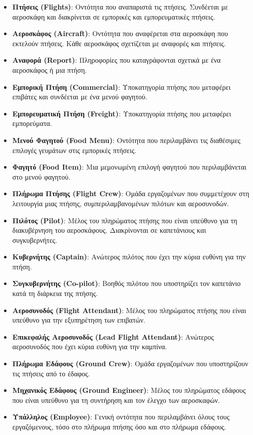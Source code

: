 \documentclass{article}
\begin{document}
\begin{itemize}
    \item \textbf{Πτήσεις (Flights)}: Οντότητα που αναπαριστά τις πτήσεις. Συνδέεται με αεροσκάφη και διακρίνεται σε εμπορικές και εμπορευματικές πτήσεις.
    \item \textbf{Αεροσκάφος (Aircraft)}: Οντότητα που αναφέρεται στα αεροσκάφη που εκτελούν πτήσεις. Κάθε αεροσκάφος σχετίζεται με αναφορές και πτήσεις.
    \item \textbf{Αναφορά (Report)}: Πληροφορίες που καταγράφονται σχετικά με ένα αεροσκάφος ή μια πτήση.
    \item \textbf{Εμπορική Πτήση (Commercial)}: Υποκατηγορία πτήσης που μεταφέρει επιβάτες και συνδέεται με ένα μενού φαγητού.
    \item \textbf{Εμπορευματική Πτήση (Freight)}: Υποκατηγορία πτήσης που μεταφέρει εμπορεύματα.
    \item \textbf{Μενού Φαγητού (Food Menu)}: Οντότητα που περιλαμβάνει τις διαθέσιμες επιλογές γευμάτων στις εμπορικές πτήσεις.
    \item \textbf{Φαγητό (Food Item)}: Μια μεμονωμένη επιλογή φαγητού που περιλαμβάνεται στο μενού φαγητού.
    \item \textbf{Πλήρωμα Πτήσης (Flight Crew)}: Ομάδα εργαζομένων που συμμετέχουν στη λειτουργία μιας πτήσης, συμπεριλαμβανομένων πιλότων και αεροσυνοδών.
    \item \textbf{Πιλότος (Pilot)}: Μέλος του πληρώματος πτήσης που είναι υπεύθυνο για τη διακυβέρνηση του αεροσκάφους. Διακρίνονται σε καπετάνιους και συγκυβερνήτες.
    \item \textbf{Κυβερνήτης (Captain)}: Ανώτερος πιλότος που έχει την κύρια ευθύνη για την πτήση.
    \item \textbf{Συγκυβερνήτης (Co-pilot)}: Βοηθός πιλότου που υποστηρίζει τον καπετάνιο κατά τη διάρκεια της πτήσης.
    \item \textbf{Αεροσυνοδός (Flight Attendant)}: Μέλος του πληρώματος πτήσης που είναι υπεύθυνο για την εξυπηρέτηση των επιβατών.
    \item \textbf{Επικεφαλής Αεροσυνοδός (Lead Flight Attendant)}: Ανώτερος αεροσυνοδός που έχει κύρια ευθύνη για την καμπίνα.
    \item \textbf{Πλήρωμα Εδάφους (Ground Crew)}: Ομάδα εργαζομένων που υποστηρίζουν τις πτήσεις από το έδαφος.
    \item \textbf{Μηχανικός Εδάφους (Ground Engineer)}: Μέλος του πληρώματος εδάφους που είναι υπεύθυνο για τη συντήρηση και τον έλεγχο των αεροσκαφών.
    \item \textbf{Υπάλληλος (Employee)}: Γενική οντότητα που περιλαμβάνει όλους τους εργαζόμενους, τόσο στο πλήρωμα πτήσης όσο και στο πλήρωμα εδάφους.

\end{itemize}
\end{document}
